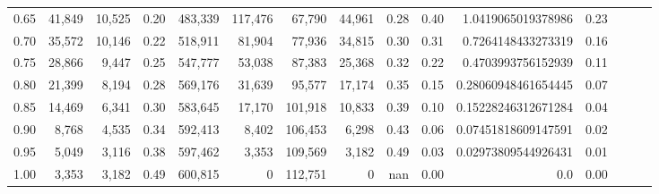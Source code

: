 \begin{tabular}{rrrrrrrrrrrrrrr}
0.65 &  41,849 &  10,525 &  0.20 &  483,339 &  117,476 &   67,790 &   44,961 &  0.28 &  0.40 &   1.0419065019378986 &      0.23 \\
0.70 &  35,572 &  10,146 &  0.22 &  518,911 &   81,904 &   77,936 &   34,815 &  0.30 &  0.31 &   0.7264148433273319 &      0.16 \\
0.75 &  28,866 &   9,447 &  0.25 &  547,777 &   53,038 &   87,383 &   25,368 &  0.32 &  0.22 &   0.4703993756152939 &      0.11 \\
0.80 &  21,399 &   8,194 &  0.28 &  569,176 &   31,639 &   95,577 &   17,174 &  0.35 &  0.15 &  0.28060948461654445 &      0.07 \\
0.85 &  14,469 &   6,341 &  0.30 &  583,645 &   17,170 &  101,918 &   10,833 &  0.39 &  0.10 &  0.15228246312671284 &      0.04 \\
0.90 &   8,768 &   4,535 &  0.34 &  592,413 &    8,402 &  106,453 &    6,298 &  0.43 &  0.06 &  0.07451818609147591 &      0.02 \\
0.95 &   5,049 &   3,116 &  0.38 &  597,462 &    3,353 &  109,569 &    3,182 &  0.49 &  0.03 &  0.02973809544926431 &      0.01 \\
1.00 &   3,353 &   3,182 &  0.49 &  600,815 &        0 &  112,751 &        0 &   nan &  0.00 &                  0.0 &      0.00 \\
\bottomrule
\end{tabular}
